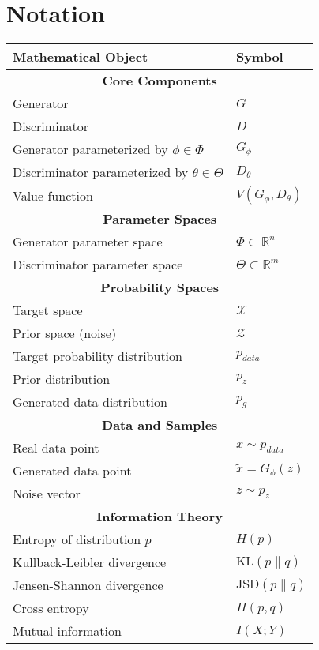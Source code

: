 \section{Notation}
\vspace{1cm}

\begin{center}
\begin{minipage}{0.9\textwidth}
\renewcommand{\arraystretch}{1.5}
\begin{tabular}{@{}p{} p{}@{}}
\toprule
\textbf{Mathematical Object} & \textbf{Symbol} \\
\midrule

\multicolumn{2}{c}{\textbf{Core Components}} \\
Generator & $G$ \\
Discriminator & $D$ \\
Generator parameterized by $\phi \in \Phi$ & $G_\phi$ \\
Discriminator parameterized by $\theta \in \Theta$ & $D_\theta$ \\
Value function & $V(G_\phi, D_\theta)$ \\
\midrule

\multicolumn{2}{c}{\textbf{Parameter Spaces}} \\
Generator parameter space & $\Phi \subset \mathbb{R}^n$ \\
Discriminator parameter space & $\Theta \subset \mathbb{R}^m$ \\
\midrule

\multicolumn{2}{c}{\textbf{Probability Spaces}} \\
Target space & $\mathcal{X}$ \\
Prior space (noise) & $\mathcal{Z}$ \\
Target probability distribution & $p_{data}$ \\
Prior distribution & $p_z$ \\
Generated data distribution & $p_g$ \\
\midrule

\multicolumn{2}{c}{\textbf{Data and Samples}} \\
Real data point & $x \sim p_{data}$ \\
Generated data point & $\tilde{x} = G_\phi(z)$ \\
Noise vector & $z \sim p_z$ \\
\midrule

\multicolumn{2}{c}{\textbf{Information Theory}} \\
Entropy of distribution $p$ & $H(p)$ \\
Kullback-Leibler divergence & $\text{KL}(p \| q)$ \\
Jensen-Shannon divergence & $\text{JSD}(p \| q)$ \\
Cross entropy & $H(p, q)$ \\
Mutual information & $I(X; Y)$ \\
\midrule


\end{tabular}
\end{minipage}
\end{center}
